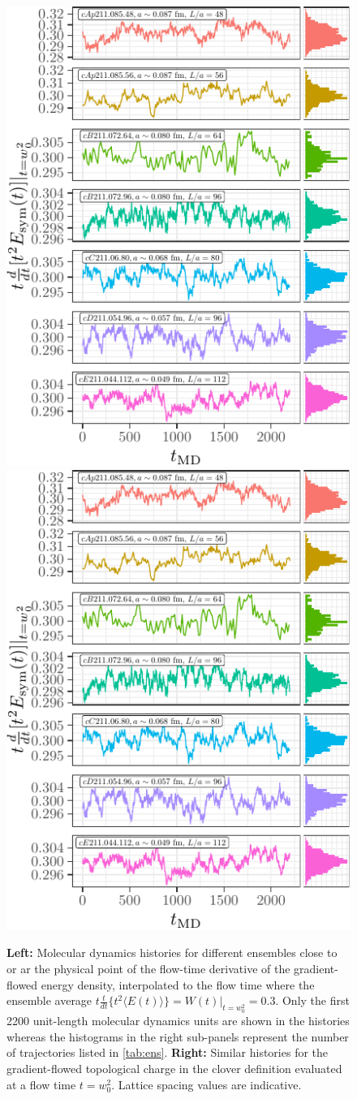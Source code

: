 \documentclass[a4paper,11pt]{article}
\begin{document}
\begin{figure}
  \includegraphics[width=0.49\linewidth,page=1]{../data/gf_observables/gf_observables_md_histories}
  \hfill
  \includegraphics[width=0.49\linewidth,page=2]{../data/gf_observables/gf_observables_md_histories}
  \caption{\textbf{Left:} Molecular dynamics histories for different ensembles close to or ar the physical point of the flow-time derivative of the gradient-flowed energy density, interpolated to the flow time where the ensemble average $t \frac{t}{dt} \lbrace t^2 \langle E(t) \rangle \rbrace = W(t)|_{t = w_0^2} = 0.3$. Only the first 2200 unit-length molecular dynamics units are shown in the histories whereas the histograms in the right sub-panels represent the number of trajectories listed in \cref{tab:ens}. \textbf{Right:} Similar histories for the gradient-flowed topological charge in the clover definition evaluated at a flow time $t = w_0^2$. Lattice spacing values are indicative.}
  \label{fig:w0_Q}
\end{figure}
\end{document}
